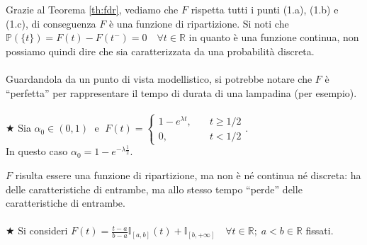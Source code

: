 Grazie al Teorema \ref{th:fdr}, vediamo che $F$ rispetta tutti i punti (1.a), (1.b) e (1.c), di conseguenza $F$ è una funzione di ripartizione. Si noti che $\mathbb{P}(\{t\}) = F(t)-F(t^-) = 0 \quad \forall t\in\mathbb{R}$ in quanto è una funzione continua, non possiamo quindi dire che sia caratterizzata da una probabilità discreta.\\
\\
Guardandola da un punto di vista modellistico, si potrebbe notare che $F$ è ``perfetta'' per rappresentare il tempo di durata di una lampadina (per esempio).\\
\\
\(\bigstar\) Sia $\alpha_0 \in (0, 1)\;$ e $\;F(t) = \begin{cases}
    1-e^{\lambda t},\quad &t\geq 1/2\\
    0, &t<1/2
\end{cases}$.\\
In questo caso $\alpha_0 = 1-e^{-\lambda\frac{1}{2}}$. 

\begin{figure}[H]
    \centering
\end{figure}

$F$ risulta essere una funzione di ripartizione, ma non è né continua né discreta: ha delle caratteristiche di entrambe, ma allo stesso tempo ``perde'' delle caratteristiche di entrambe.\\
\\
\(\bigstar\) Si consideri $F(t) = \frac{t-a}{b-a}\mathbb{I}_{[a, b]}(t) + \mathbb{I}_{[b, +\infty]}\quad \forall t\in\mathbb{R};\;a<b\in\mathbb{R}$ fissati.

